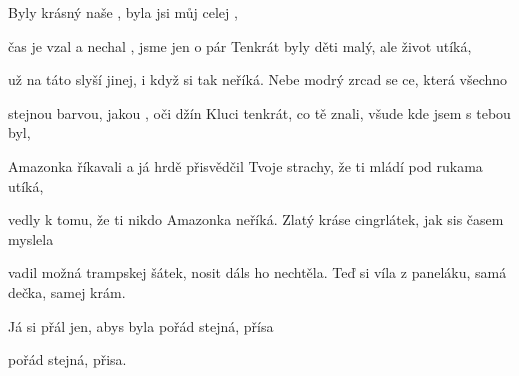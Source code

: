 
\zs
Byly krásný naše ,
{byla} jsi můj celej ,  

čas je vzal a nechal ,
 jsme jen o pár 
\ks
\zs
Tenkrát byly děti malý, ale život utíká,

už na táto slyší jinej, i když si tak neříká.
\ks
\zr
Nebe modrý zrcad se ce, která všechno 

stejnou barvou, jakou ,  oči džín
\kr
\zs
Kluci tenkrát, co tě znali, všude kde jsem s tebou byl,

Amazonka říkavali a já hrdě přisvědčil
\ks
\zs
Tvoje strachy, že ti mládí pod rukama utíká,

vedly k tomu, že ti nikdo Amazonka neříká.
\ks
\zr  \kr
\zs
Zlatý kráse cingrlátek,
jak sis časem myslela

vadil možná trampskej šátek,
nosit dáls ho nechtěla.
\ks
\zs
Teď si víla z paneláku, samá dečka, samej krám.

Já si přál jen, abys byla pořád stejná, přísa 

pořád stejná, přisa.
\ks
\zr \kr
\kp







